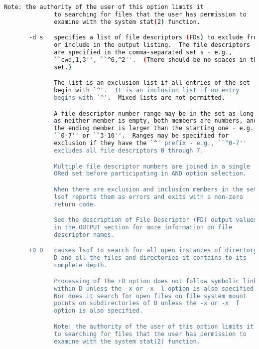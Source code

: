 {{\begin{lstlisting}[language=bash]
              Note: the authority of the user of this option limits it
              to searching for files that the user has permission to
              examine with the system stat(2) function.

       -d s   specifies a list of file descriptors (FDs) to exclude from
              or include in the output listing.  The file descriptors
              are specified in the comma-separated set s - e.g.,
              ``cwd,1,3'', ``^6,^2''.  (There should be no spaces in the
              set.)

              The list is an exclusion list if all entries of the set
              begin with `^'.  It is an inclusion list if no entry
              begins with `^'.  Mixed lists are not permitted.

              A file descriptor number range may be in the set as long
              as neither member is empty, both members are numbers, and
              the ending member is larger than the starting one - e.g.,
              ``0-7'' or ``3-10''.  Ranges may be specified for
              exclusion if they have the `^' prefix - e.g., ``^0-7''
              excludes all file descriptors 0 through 7.

              Multiple file descriptor numbers are joined in a single
              ORed set before participating in AND option selection.

              When there are exclusion and inclusion members in the set,
              lsof reports them as errors and exits with a non-zero
              return code.

              See the description of File Descriptor (FD) output values
              in the OUTPUT section for more information on file
              descriptor names.

       +D D   causes lsof to search for all open instances of directory
              D and all the files and directories it contains to its
              complete depth.

              Processing of the +D option does not follow symbolic links
              within D unless the -x or -x  l option is also specified.
              Nor does it search for open files on file system mount
              points on subdirectories of D unless the -x or -x  f
              option is also specified.

              Note: the authority of the user of this option limits it
              to searching for files that the user has permission to
              examine with the system stat(2) function.


\end{lstlisting}}}

